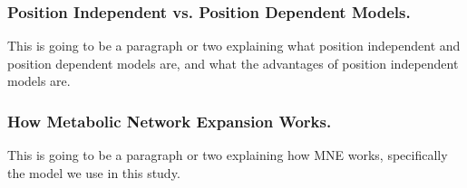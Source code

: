 \subsubsection*{Position Independent vs. Position Dependent Models.}
This is going to be a paragraph or two explaining what position independent and position dependent models are, and what the advantages of position independent models are.


\subsubsection*{How Metabolic Network Expansion Works.}
This is going to be a paragraph or two explaining how MNE works, specifically the model we use in this study.

